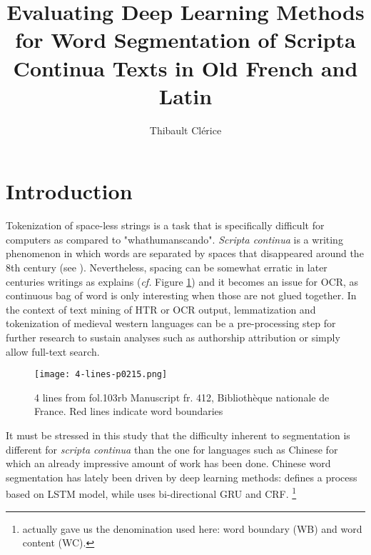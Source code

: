 \documentclass{jdmdh}
\title{Evaluating Deep Learning Methods for Word Segmentation of Scripta Continua Texts in Old French and Latin}
\author[1]{Thibault Clérice}
\affil[1]{École nationale des Chartes, France}
\affil[2]{Université Lyon 3, France}
\begin{document}
\maketitle



\section{Introduction}

Tokenization of space-less strings is a task that is specifically difficult for computers as compared to "whathumanscando". \textit{Scripta continua} is a writing phenomenon in which words are separated by spaces that disappeared around the 8th century (see \citet{zanna1998lecture}). Nevertheless, spacing can be somewhat erratic in later centuries writings as \citet{stutzmann} explains (\textit{cf.} Figure \ref{fig:4lines}) and it becomes an issue for OCR, as continuous bag of word is only interesting when those are not glued together. In the context of text mining of HTR or OCR output, lemmatization and tokenization of medieval western languages can be a pre-processing step for further research to sustain analyses such as authorship attribution or simply allow full-text search.

\begin{figure}[!ht]
  \centering
  \texttt{[image: 4-lines-p0215.png]}

  \caption{ 4 lines from fol.103rb Manuscript fr. 412, Bibliothèque nationale de France.  Red lines indicate word boundaries}
  \label{fig:4lines}
\end{figure}

It must be stressed in this study that the difficulty inherent to segmentation is different for \textit{scripta continua} than the one for languages such as Chinese for which an already impressive amount of work has been done. Chinese word segmentation has lately been driven by deep learning methods: \citet{chen2015long} defines a process based on LSTM model, while \citet{yu2019learning} uses bi-directional GRU and CRF. \footnote{\citet{huang2019realistic} actually gave us the denomination used here: word boundary (WB) and word content (WC).}
\end{document}
